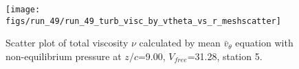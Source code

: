 \begin{figure}[H]
\centering
\texttt{[image: figs/run\_49/run\_49\_turb\_visc\_by\_vtheta\_vs\_r\_meshscatter]}
\caption{Scatter plot of total viscosity $\nu$ calculated by mean $\bar{v}_{\theta}$ equation with non-equilibrium pressure at $z/c$=9.00, $V_{free}$=31.28, station 5.}
\label{fig:run_49_turb_visc_by_vtheta_vs_r_meshscatter}
\end{figure}


